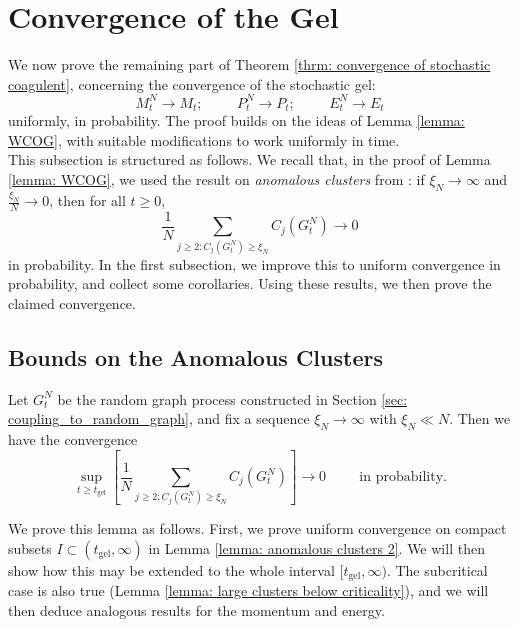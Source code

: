 \section{Convergence of the Gel} \label{sec: COG}
We now prove the remaining part of Theorem \ref{thrm: convergence of stochastic coagulent}, concerning the convergence of the stochastic gel: \begin{equation} M^N_t\rightarrow M_t; \hspace{1cm} P^N_t\rightarrow P_t;\hspace{1cm} E^N_t\rightarrow E_t\end{equation} uniformly, in probability.  The proof builds on the ideas of Lemma \ref{lemma: WCOG}, with suitable modifications to work uniformly in time. \medskip \\ This subsection is structured as follows. We recall that, in the proof of Lemma \ref{lemma: WCOG}, we used the result on \emph{anomalous clusters} from \cite{BJR07}: if $\xi_N\rightarrow \infty$ and $\frac{\xi_N}{N}\rightarrow 0$, then for all $t\ge 0$,  \begin{equation} \frac{1}{N}\sum_{j\ge 2: C_j(G^N_t)\ge \xi_N} C_j(G^N_t)\rightarrow 0 \end{equation} in probability. In the first subsection, we improve this to uniform convergence in probability, and collect some corollaries. Using these results, we then prove the claimed convergence.
\subsection{Bounds on the Anomalous Clusters}
\begin{lemma} \label{lemma: anomalous clusters} Let $G^N_t$ be the random graph process constructed in Section \ref{sec: coupling_to_random_graph}, and fix a sequence $\xi_N\rightarrow \infty$ with $\xi_N\ll N$. Then we have the convergence \begin{equation}
       \sup_{t \geq t_\text{gel}}\left[\frac{1}{N}\sum_{j\geq 2: C_j(G^N_t)\geq \xi_N} C_j(G^N_t)\right] \rightarrow 0 \hspace{1cm}\text{in probability.}\end{equation} 
        \end{lemma} 
       
       We prove this lemma as follows. First, we prove uniform convergence  on compact subsets $I\subset (t_\text{gel}, \infty)$ in Lemma \ref{lemma: anomalous clusters 2}. We will then show how this may be extended to the whole interval $[t_\text{gel}, \infty)$. The subcritical case is also true (Lemma \ref{lemma: large clusters below criticality}), and we will then deduce analogous results for the momentum and energy.
       
